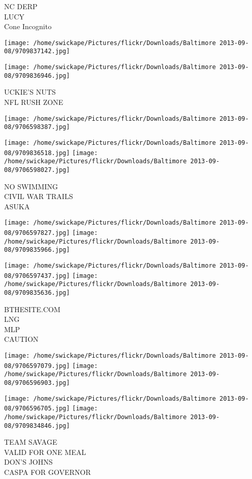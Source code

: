 \documentclass[10pt,letterpaper]{article}
\begin{document}
NC DERP\\
LUCY\\
Cone Incognito
\pagebreak

\texttt{[image: /home/swickape/Pictures/flickr/Downloads/Baltimore 2013-09-08/9709837142.jpg]}

\vspace{0.25in}
\texttt{[image: /home/swickape/Pictures/flickr/Downloads/Baltimore 2013-09-08/9709836946.jpg]}

UCKIE'S NUTS\\
NFL RUSH ZONE
\pagebreak

\texttt{[image: /home/swickape/Pictures/flickr/Downloads/Baltimore 2013-09-08/9706598387.jpg]}

\vspace{0.25in}
\texttt{[image: /home/swickape/Pictures/flickr/Downloads/Baltimore 2013-09-08/9709836518.jpg]}
\texttt{[image: /home/swickape/Pictures/flickr/Downloads/Baltimore 2013-09-08/9706598027.jpg]}

NO SWIMMING\\
CIVIL WAR TRAILS\\
ASUKA
\pagebreak

\texttt{[image: /home/swickape/Pictures/flickr/Downloads/Baltimore 2013-09-08/9706597827.jpg]}
\texttt{[image: /home/swickape/Pictures/flickr/Downloads/Baltimore 2013-09-08/9709835966.jpg]}

\texttt{[image: /home/swickape/Pictures/flickr/Downloads/Baltimore 2013-09-08/9706597437.jpg]}
\texttt{[image: /home/swickape/Pictures/flickr/Downloads/Baltimore 2013-09-08/9709835636.jpg]}

BTHESITE.COM\\
LNG\\
MLP\\
CAUTION
\pagebreak

\texttt{[image: /home/swickape/Pictures/flickr/Downloads/Baltimore 2013-09-08/9706597079.jpg]}
\texttt{[image: /home/swickape/Pictures/flickr/Downloads/Baltimore 2013-09-08/9706596903.jpg]}

\texttt{[image: /home/swickape/Pictures/flickr/Downloads/Baltimore 2013-09-08/9706596705.jpg]}
\texttt{[image: /home/swickape/Pictures/flickr/Downloads/Baltimore 2013-09-08/9709834846.jpg]}

TEAM SAVAGE\\
VALID FOR ONE MEAL\\
DON'S JOHNS\\
CASPA FOR GOVERNOR
\pagebreak
\end{document}
